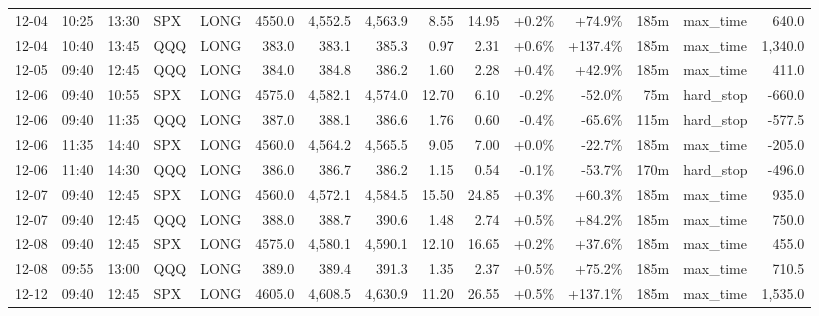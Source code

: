 \documentclass[11pt,a4paper,twoside]{article}
\begin{document}
\begin{landscape}
\begin{center}
\begin{longtable}{>{\color{txtmain}}l l l l l r r r r r r r r >{\color{txtmain}}l r}
12-04 & 10:25 & 13:30 & SPX & LONG & 4550.0 & 4,552.5 & 4,563.9 & 8.55 & 14.95 & \textcolor{wingreen}{+0.2\%} & \textcolor{wingreen}{+74.9\%} & 185m & max\_time & \textcolor{wingreen}{640.0} \\
12-04 & 10:40 & 13:45 & QQQ & LONG & 383.0 & 383.1 & 385.3 & 0.97 & 2.31 & \textcolor{wingreen}{+0.6\%} & \textcolor{wingreen}{+137.4\%} & 185m & max\_time & \textcolor{wingreen}{1,340.0} \\
12-05 & 09:40 & 12:45 & QQQ & LONG & 384.0 & 384.8 & 386.2 & 1.60 & 2.28 & \textcolor{wingreen}{+0.4\%} & \textcolor{wingreen}{+42.9\%} & 185m & max\_time & \textcolor{wingreen}{411.0} \\
12-06 & 09:40 & 10:55 & SPX & LONG & 4575.0 & 4,582.1 & 4,574.0 & 12.70 & 6.10 & \textcolor{lossred}{-0.2\%} & \textcolor{lossred}{-52.0\%} & 75m & hard\_stop & \textcolor{lossred}{-660.0} \\
12-06 & 09:40 & 11:35 & QQQ & LONG & 387.0 & 388.1 & 386.6 & 1.76 & 0.60 & \textcolor{lossred}{-0.4\%} & \textcolor{lossred}{-65.6\%} & 115m & hard\_stop & \textcolor{lossred}{-577.5} \\
12-06 & 11:35 & 14:40 & SPX & LONG & 4560.0 & 4,564.2 & 4,565.5 & 9.05 & 7.00 & \textcolor{wingreen}{+0.0\%} & \textcolor{lossred}{-22.7\%} & 185m & max\_time & \textcolor{lossred}{-205.0} \\
12-06 & 11:40 & 14:30 & QQQ & LONG & 386.0 & 386.7 & 386.2 & 1.15 & 0.54 & \textcolor{lossred}{-0.1\%} & \textcolor{lossred}{-53.7\%} & 170m & hard\_stop & \textcolor{lossred}{-496.0} \\
12-07 & 09:40 & 12:45 & SPX & LONG & 4560.0 & 4,572.1 & 4,584.5 & 15.50 & 24.85 & \textcolor{wingreen}{+0.3\%} & \textcolor{wingreen}{+60.3\%} & 185m & max\_time & \textcolor{wingreen}{935.0} \\
12-07 & 09:40 & 12:45 & QQQ & LONG & 388.0 & 388.7 & 390.6 & 1.48 & 2.74 & \textcolor{wingreen}{+0.5\%} & \textcolor{wingreen}{+84.2\%} & 185m & max\_time & \textcolor{wingreen}{750.0} \\
12-08 & 09:40 & 12:45 & SPX & LONG & 4575.0 & 4,580.1 & 4,590.1 & 12.10 & 16.65 & \textcolor{wingreen}{+0.2\%} & \textcolor{wingreen}{+37.6\%} & 185m & max\_time & \textcolor{wingreen}{455.0} \\
12-08 & 09:55 & 13:00 & QQQ & LONG & 389.0 & 389.4 & 391.3 & 1.35 & 2.37 & \textcolor{wingreen}{+0.5\%} & \textcolor{wingreen}{+75.2\%} & 185m & max\_time & \textcolor{wingreen}{710.5} \\
12-12 & 09:40 & 12:45 & SPX & LONG & 4605.0 & 4,608.5 & 4,630.9 & 11.20 & 26.55 & \textcolor{wingreen}{+0.5\%} & \textcolor{wingreen}{+137.1\%} & 185m & max\_time & \textcolor{wingreen}{1,535.0} \\

\end{longtable}
\end{center}
\end{landscape}
\end{document}
